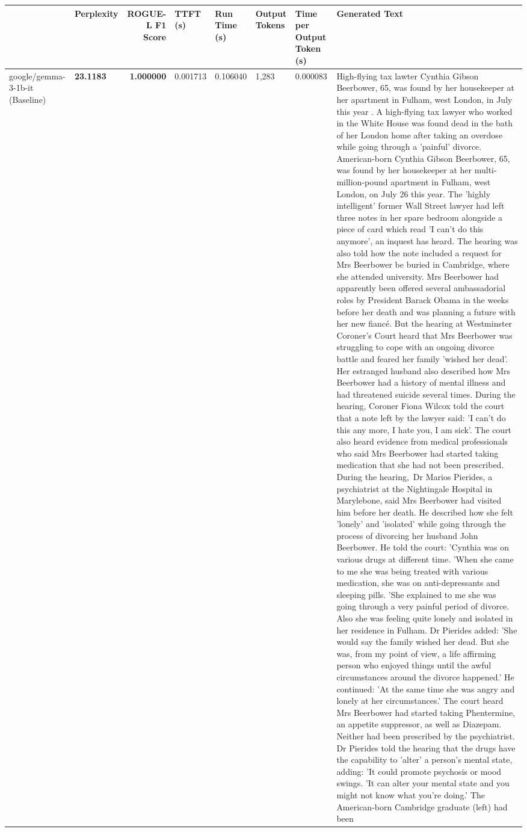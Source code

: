 \begin{table}[H]
\label{tab:evaluation-pipeline-13}
\begin{tabular}{llrlllll}
\toprule
 & Perplexity & ROGUE-L F1 Score & TTFT (s) & Run Time (s) & Output Tokens & Time per Output Token (s) & Generated Text \\
\midrule
google/gemma-3-1b-it (Baseline) & \bfseries 23.1183 & \bfseries 1.000000 & 0.001713 & 0.106040 & 1,283 & 0.000083 & High-flying tax lawter Cynthia Gibson Beerbower, 65, was found by her housekeeper at her apartment in Fulham, west London, in July this year . A high-flying tax lawyer who worked in the White House was found dead in the bath of her London home after taking an overdose while going through a 'painful' divorce. American-born Cynthia Gibson Beerbower, 65, was found by her housekeeper at her multi-million-pound apartment in Fulham, west London, on July 26 this year. The 'highly intelligent' former Wall Street lawyer had left three notes in her spare bedroom alongside a piece of card which read 'I can't do this anymore', an inquest has heard. The hearing was also told how the note included a request for Mrs Beerbower be buried in Cambridge, where she attended university. Mrs Beerbower had apparently been offered several ambassadorial roles by President Barack Obama in the weeks before her death and was planning a future with her new fiancé. But the hearing at Westminster Coroner's Court heard that Mrs Beerbower was struggling to cope with an ongoing divorce battle and feared her family 'wished her dead'. Her estranged husband also described how Mrs Beerbower had a history of mental illness and had threatened suicide several times. During the hearing, Coroner Fiona Wilcox told the court that a note left by the lawyer said: 'I can't do this any more, I hate you, I am sick'. The court also heard evidence from medical professionals who said Mrs Beerbower had started taking medication that she had not been prescribed. During the hearing, Dr Marios Pierides, a psychiatrist at the Nightingale Hospital in Marylebone, said Mrs Beerbower had visited him before her death. He described how she felt 'lonely' and 'isolated' while going through the process of divorcing her husband John Beerbower. He told the court: 'Cynthia was on various drugs at different time. 'When she came to me she was being treated with various medication, she was on anti-depressants and sleeping pills. 'She explained to me she was going through a very painful period of divorce. Also she was feeling quite lonely and isolated in her residence in Fulham. Dr Pierides added: 'She would say the family wished her dead. But she was, from my point of view, a life affirming person who enjoyed things until the awful circumstances around the divorce happened.' He continued: 'At the same time she was angry and lonely at her circumstances.' The court heard Mrs Beerbower had started taking Phentermine, an appetite suppressor, as well as Diazepam. Neither had been prescribed by the psychiatrist. Dr Pierides told the hearing that the drugs have the capability to 'alter' a person's mental state, adding: 'It could promote psychosis or mood swings. 'It can alter your mental state and you might not know what you're doing.' The American-born Cambridge graduate (left) had been 
\end{tabular}
\end{table}
